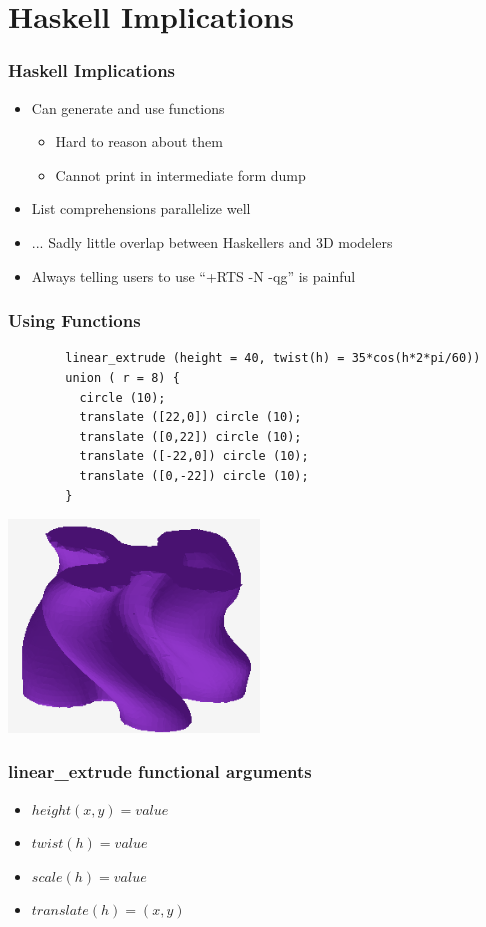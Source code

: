 \documentclass{beamer}
\begin{document}
\section{Haskell Implications}

\begin{frame}[fragile]
  \frametitle{Haskell Implications}
  \begin{itemize}
  \item Can generate and use functions
    \begin{itemize}
    \item Hard to reason about them
    \item Cannot print in intermediate form dump
    \end{itemize}
  \item List comprehensions parallelize well
  \item ... Sadly little overlap between Haskellers and 3D modelers
  \item Always telling users to use ``+RTS -N -qg'' is painful
  \end{itemize}
\end{frame}

\begin{frame}[fragile]
  \frametitle{Using Functions}
      \lstset{basicstyle=\ttfamily\scriptsize}
      \begin{lstlisting}
        linear_extrude (height = 40, twist(h) = 35*cos(h*2*pi/60))
        union ( r = 8) {
          circle (10);
          translate ([22,0]) circle (10);
          translate ([0,22]) circle (10);
          translate ([-22,0]) circle (10);
          translate ([0,-22]) circle (10);
        }
      \end{lstlisting}
      \includegraphics[width=0.5\textwidth, center]{website-example_object.png}
\end{frame}

\begin{frame}[fragile]
\frametitle{linear\_extrude functional arguments}
\begin{itemize}
\item $height(x,y) = value$
\item $twist(h) = value$
\item $scale(h) = value$
\item $translate(h) = (x,y)$
\end{itemize}
\end{frame}
\end{document}

